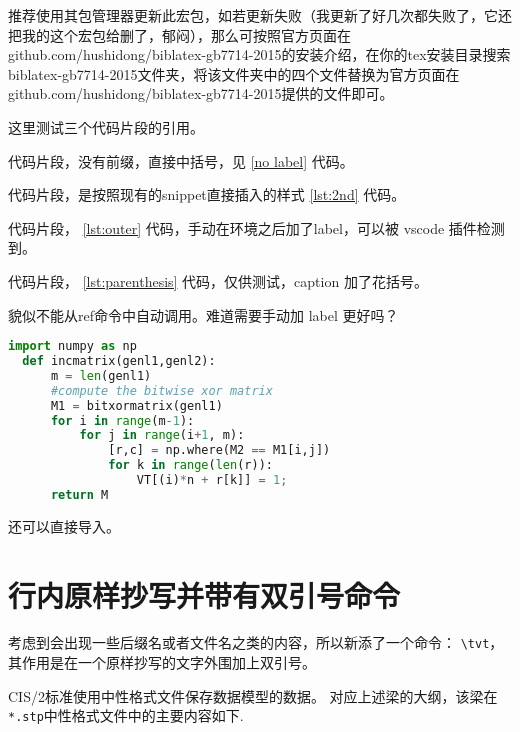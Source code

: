 \documentclass[../Main/thesis]{subfiles}
\begin{document}
推荐使用其包管理器更新此宏包，如若更新失败（我更新了好几次都失败了，它还把我的这个宏包给删了，郁闷），那么可按照官方页面在github.com/hushidong/biblatex-gb7714-2015的安装介绍，在你的tex安装目录搜索biblatex-gb7714-2015文件夹，将该文件夹中的四个文件替换为官方页面在github.com/hushidong/biblatex-gb7714-2015提供的文件即可。

这里测试三个代码片段的引用。

代码片段，没有前缀，直接中括号，见 \ref{no label} 代码。

代码片段，是按照现有的snippet直接插入的样式 \ref{lst:2nd} 代码。

代码片段， \ref{lst:outer} 代码，手动在环境之后加了label，可以被 vscode 插件检测到。

代码片段， \ref{lst:parenthesis} 代码，仅供测试，caption 加了花括号。

貌似不能从ref命令中自动调用。难道需要手动加 label 更好吗？
\begin{lstlisting}[language=Python,
  caption={Must have Parenthesis},
  label=lst:parenthesis]
  import numpy as np
  def incmatrix(genl1,genl2):
      m = len(genl1)
      #compute the bitwise xor matrix
      M1 = bitxormatrix(genl1)
      for i in range(m-1):
          for j in range(i+1, m):
              [r,c] = np.where(M2 == M1[i,j])
              for k in range(len(r)):
                  VT[(i)*n + r[k]] = 1;
      return M
\end{lstlisting}

还可以直接导入。



\section{行内原样抄写并带有双引号命令}
\label{sec:newfunction}

考虑到会出现一些后缀名或者文件名之类的内容，所以新添了一个命令：
\verb|\tvt|，
其作用是在一个原样抄写的文字外围加上双引号。

CIS/2标准使用中性格式文件保存数据模型的数据。
对应上述梁的大纲，该梁在\texttt{*.stp}中性格式文件中的主要内容如下.
\end{document}

